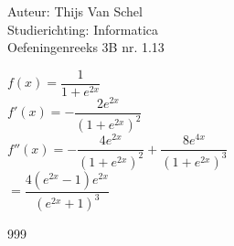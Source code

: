 \documentclass[a4paper]{article}
\begin{document}
  
\noindent \large Auteur: Thijs Van Schel \\
\noindent \large Studierichting: Informatica\\
\noindent \large Oefeningenreeks 3B nr. 1.13\\

\medskip

\normalsize

$f(x) = \dfrac{1}{1+e^{2x}}$\\

$f'(x) = -\dfrac{2e^{2x}}{(1+e^{2x})^2}$\\

$f''(x) = -\dfrac{4e^{2x}}{(1+e^{2x})^2} + \dfrac{8e^{4x}}{(1+e^{2x})^3}$\\

$= \dfrac{4(e^{2x}-1)e^{2x}}{(e^{2x}+1)^3}$

\begin{thebibliography}{999}
\end{thebibliography}
\end{document}
